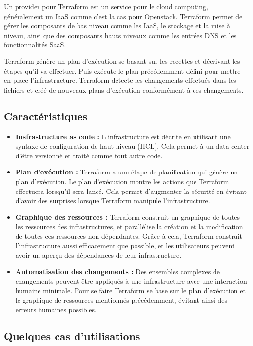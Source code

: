\documentclass[]{article}
\begin{document}
Un provider pour Terraform est un service pour le cloud computing, généralement un
IaaS comme c'est la cas pour Openstack. 
Terraform permet de gérer les composants de bas niveau comme les IaaS,
le stockage et la mise à niveau, ainsi que des composants hauts niveaux
comme les entrées DNS et les fonctionnalités SaaS.

Terraform génère un plan d'exécution se basant sur les recettes et
décrivant les étapes qu'il va effectuer. Puis exécute le plan
précédemment défini pour mettre en place l'infrastructure. Terraform
détecte les changements effectués dans les fichiers et créé de nouveaux
plans d'exécution conformément à ces changements.

\subsection{Caractéristiques}\label{caractuxe9ristiques}

\begin{itemize}
\item
  \textbf{Insfrastructure as code :} L'infrastructure est décrite en
  utilisant une syntaxe de configuration de haut niveau (HCL). Cela
  permet à un data center d'être versionné et traité comme tout autre
  code.
\item
  \textbf{Plan d'exécution :} Terraform a une étape de \og
  planification \fg qui génère un plan d'exécution. Le
  plan d'exécution montre les actions que Terraform effectuera lorsqu'il
  sera lancé. Cela permet d'augmenter la sécurité en évitant d'avoir des
  surprises lorsque Terraform manipule l'infrastructure.
\item
  \textbf{Graphique des ressources :} Terraform construit un graphique de
  toutes les ressources des infrastructures, et parallélise la création
  et la modification de toutes ces ressources non-dépendantes. Grâce à
  cela, Terraform construit l'infrastructure aussi efficacement que
  possible, et les utilisateurs peuvent avoir un aperçu des dépendances
  de leur infrastructure.
\item
  \textbf{Automatisation des changements :} Des ensembles complexes de
  changements peuvent être appliqués à une infrastructure avec une
  interaction humaine minimale. Pour se faire Terraform se base sur le
  plan d'exécution et le graphique de ressources mentionnés
  précédemment, évitant ainsi des erreurs humaines possibles.
\end{itemize}

\subsection{Quelques cas d'utilisations}\label{quelques-cas-dutilisations}
\end{document}
